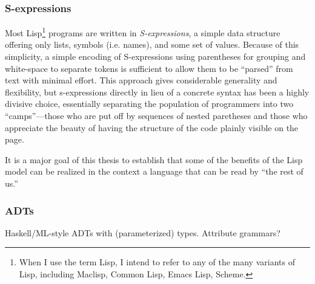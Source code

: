 \subsubsection{S-expressions}
Most Lisp\footnote{When I use the term Lisp, I intend to refer to any of the many variants of Lisp, including Maclisp, Common Lisp, Emacs Lisp, Scheme.} programs are written in \emph{S-expressions}, a simple data structure offering only lists, symbols (i.e. names), and some set of values. Because of this simplicity, a simple encoding of S-expressions using parentheses for grouping and white-space to separate tokens is sufficient to allow them to be ``parsed'' from text with minimal effort. This approach gives considerable generality and flexibility, but s-expressions directly in lieu of a concrete syntax has been a highly divisive choice, essentially separating the population of programmers into two ``camps''---those who are put off by sequences of nested paretheses and those who appreciate the beauty of having the structure of the code plainly visible on the page\cite{?}.

It is a major goal of this thesis to establish that some of the benefits of the Lisp model can be realized in the context a language that can be read by ``the rest of us.''

\subsubsection{ADTs}
Haskell/ML-style ADTs with (parameterized) types. Attribute grammars?


